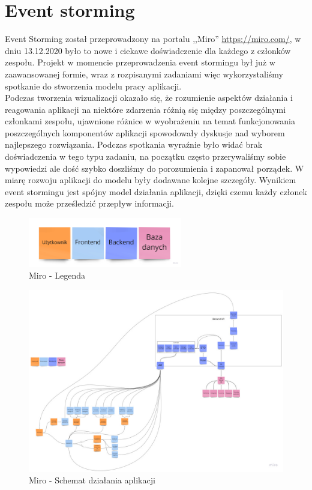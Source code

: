 \documentclass[12pt,a4paper]{article}
\begin{document}
	\newpage

	\section{Event storming}
		\indent Event Storming został przeprowadzony na portalu ,,Miro'' \url{https://miro.com/}, w dniu 13.12.2020 było to nowe i ciekawe doświadczenie dla każdego z członków zespołu.
		Projekt w momencie przeprowadzenia event stormingu był już w zaawansowanej formie, wraz z rozpisanymi zadaniami więc wykorzystaliśmy spotkanie
		do stworzenia modelu pracy aplikacji.\\
		\indent Podczas tworzenia wizualizacji okazało się, że rozumienie aspektów działania i reagowania aplikacji na niektóre zdarzenia
		różnią się między poszczególnymi członkami zespołu, ujawnione różnice w wyobrażeniu na temat funkcjonowania poszczególnych komponentów aplikacji spowodowały dyskusje
		nad wyborem najlepszego rozwiązania. Podczas spotkania wyraźnie było widać brak doświadczenia w tego typu zadaniu, na początku często przerywaliśmy sobie wypowiedzi ale dość szybko
		doszliśmy do porozumienia i zapanował porządek. W miarę rozwoju aplikacji do modelu były dodawane kolejne szczegóły. 
		Wynikiem event stormingu jest spójny model działania aplikacji, dzięki czemu każdy członek zespołu może prześledzić przepływ informacji.
		\begin{figure}[H]
			\centering
			\includegraphics[width=0.6\textwidth]{img/miro_2.jpg}
			\caption{Miro - Legenda}
			\label{fig:miro-legenda}
		\end{figure}				
		\begin{figure}[H]
			\centering
			\includegraphics[width=\textwidth]{img/miro_1.jpg}
			\caption{Miro - Schemat działania aplikacji}
			\label{fig:miro-ogolne}
		\end{figure}
\end{document}
